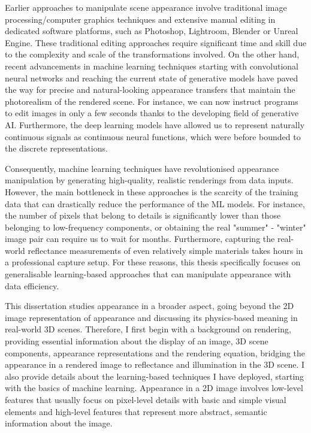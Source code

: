 Earlier approaches to manipulate scene appearance involve traditional image processing/computer graphics techniques and extensive manual editing in dedicated software platforms, such as Photoshop, Lightroom, Blender or Unreal Engine. These traditional editing approaches require significant time and skill due to the complexity and scale of the transformations involved. On the other hand, recent advancements in machine learning techniques starting with convolutional neural networks and reaching the current state of generative models have paved the way for precise and natural-looking appearance transfers that maintain the photorealism of the rendered scene. For instance, we can now instruct programs to edit images in only a few seconds thanks to the developing field of generative AI. Furthermore, the deep learning models have allowed us to represent naturally continuous signals as continuous neural functions, which were before bounded to the discrete representations. 

Consequently, machine learning techniques have revolutionised appearance manipulation by generating high-quality, realistic renderings from data inputs. However, the main bottleneck in these approaches is the scarcity of the training data that can drastically reduce the performance of the ML models. For instance, the number of pixels that belong to details is significantly lower than those belonging to low-frequency components, or obtaining the real "summer" - "winter" image pair can require us to wait for months. Furthermore, capturing the real-world reflectance measurements of even relatively simple materials takes hours in a professional capture setup. For these reasons, this thesis specifically focuses on generalisable learning-based approaches that can manipulate appearance with data efficiency.

This dissertation studies appearance in a broader aspect, going beyond the 2D image representation of appearance and discussing its physics-based meaning in real-world 3D scenes. Therefore, I first begin with a background on rendering, providing essential information about the display of an image, 3D scene components, appearance representations and the rendering equation, bridging the appearance in a rendered image to reflectance and illumination in the 3D scene. I also provide details about the learning-based techniques I have deployed, starting with the basics of machine learning. Appearance in a 2D image involves low-level features that usually focus on pixel-level details with basic and simple visual elements and high-level features that represent more abstract, semantic information about the image. 

